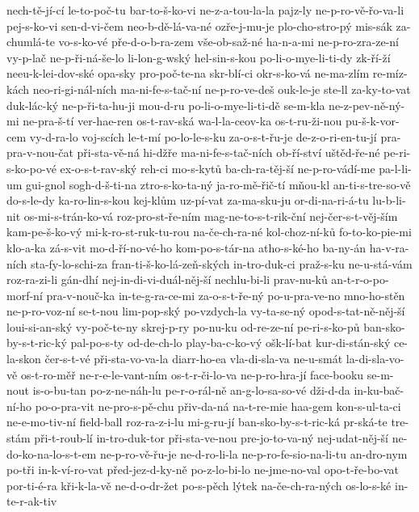 nech-tě-jí-cí
le-to-poč-tu
bar-to-š-ko-vi
ne-z-a-tou-la-la
pajz-ly
ne-p-ro-vě-řo-va-li
pej-s-ko-vi
sen-d-vi-čem
neo-b-dě-lá-va-né
ozře-j-mu-je
plo-cho-stro-pý
mis-sák
za-chumlá-te
vo-s-ko-vé
pře-d-o-b-ra-zem
vše-ob-saž-né
ha-n-a-mi
ne-p-ro-zra-ze-ní
vy-p-lač
ne-p-ři-ná-še-lo
li-lon-g-wský
hel-sin-s-kou
po-li-o-mye-li-ti-dy
zk-ří-ží
neeu-k-lei-dov-ské
opa-sky
pro-poč-te-na
skr-blí-ci
okr-s-ko-vá
ne-ma-zlím
re-míz-kách
neo-ri-gi-nál-ních
ma-ni-fe-s-tač-ní
ne-p-ro-ve-deš
ouk-le-je
ste-ll
za-ky-to-vat
duk-lác-ký
ne-p-ři-ta-hu-ji
mou-d-ru
po-li-o-mye-li-ti-dě
se-m-kla
ne-z-pev-ně-ný-mi
ne-pra-š-tí
ver-hae-ren
os-t-rav-ská
wa-l-la-ceov-ka
os-t-ru-ži-nou
pu-š-k-vor-cem
vy-d-ra-lo
voj-scích
le-t-mí
po-lo-le-s-ku
za-o-s-t-řu-je
de-z-o-ri-en-tu-jí
pra-pra-v-nou-čat
při-sta-vě-ná
hi-džře
ma-ni-fe-s-tač-ních
ob-ří-ství
uštěd-ře-né
pe-ri-s-ko-po-vé
ex-o-s-t-rav-ský
reh-ci
mo-s-kytů
ba-ch-ra-těj-ší
ne-p-ro-vádí-me
pa-l-li-um
gui-gnol
sogh-d-š-ti-na
ztro-s-ko-ta-ný
ja-ro-mě-řič-tí
mňou-kl
an-ti-s-tre-so-vě
do-s-le-dy
ka-ro-lin-s-kou
kej-klům
uz-pí-vat
za-ma-sku-ju
or-di-na-ri-á-tu
lu-b-li-nit
os-mi-s-trán-ko-vá
roz-pro-st-ře-ním
mag-ne-to-s-t-rik-ční
nej-čer-s-t-věj-ším
kam-pe-š-ko-vý
mi-k-ro-st-ruk-tu-rou
na-če-ch-ra-né
kol-choz-ní-ků
fo-to-ko-pie-mi
klo-a-ka
zá-s-vit
mo-d-ří-no-vé-ho
kom-po-s-tár-na
atho-s-ké-ho
ba-ny-án
ha-v-ra-ních
sta-fy-lo-schi-za
fran-ti-š-ko-lá-zeň-ských
in-tro-duk-ci
praž-s-ku
ne-u-stá-vám
roz-ra-zi-li
gán-dhí
nej-in-di-vi-duál-něj-ší
nechlu-bi-li
prav-nu-ků
an-t-r-o-po-morf-ní
pra-v-nouč-ka
in-te-g-ra-ce-mi
za-o-s-t-ře-ný
po-u-pra-ve-no
mno-ho-stěn
ne-p-ro-voz-ní
se-t-nou
lim-pop-ský
po-vzdych-la
vy-ta-se-ný
opod-s-tat-ně-něj-ší
loui-si-an-ský
vy-poč-te-ny
skrej-p-ry
po-nu-ku
od-re-ze-ní
pe-ri-s-ko-pů
ban-sko-by-s-t-ric-ký
pal-po-s-ty
od-de-ch-lo
play-ba-c-ko-vý
ošk-lí-bat
kur-di-stán-ský
ce-la-skon
čer-s-t-vé
při-sta-vo-va-la
diarr-ho-ea
vla-di-sla-va
ne-u-smát
la-di-sla-vo-vě
os-t-ro-měř
ne-r-e-le-vant-ním
os-t-r-či-lo-va
ne-p-ro-hra-jí
face-booku
se-m-nout
is-o-bu-tan
po-z-ne-náh-lu
pe-r-o-rál-ně
an-g-lo-sa-so-vé
dži-d-da
in-ku-bač-ní-ho
po-o-pra-vit
ne-pro-s-pě-chu
přiv-da-ná
na-t-re-mie
haa-gem
kon-s-ul-ta-ci
ne-e-mo-tiv-ní
field-ball
roz-ra-z-i-lu
mi-g-ru-jí
ban-sko-by-s-t-ric-ká
pr-ská-te
tre-stám
při-t-roub-lí
in-tro-duk-tor
při-sta-ve-nou
pre-jo-to-va-ný
nej-udat-něj-ší
ne-do-ko-na-lo-s-t-em
ne-p-ro-vě-řu-je
ne-d-ro-li-la
ne-p-ro-fe-sio-na-li-tu
an-dro-nym
po-tři
in-k-ví-ro-vat
před-jez-d-ky-ně
po-z-lo-bi-lo
ne-jme-no-val
opo-t-ře-bo-vat
por-ti-é-ra
kři-k-la-vě
ne-d-o-dr-žet
po-s-pěch
lýtek
na-če-ch-ra-ných
os-lo-s-ké
in-te-r-ak-tiv
